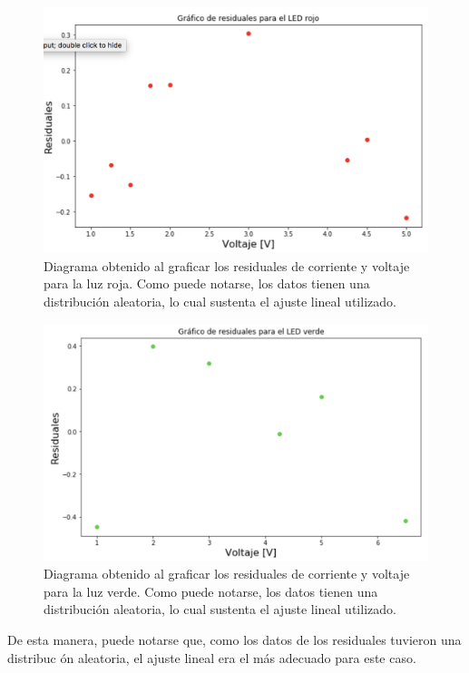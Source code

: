\documentclass[%
 reprint,
 amsmath,amssymb,
 aps,
]{revtex4-1}
\begin{document}
\begin{figure}[H]
    \centering
    \includegraphics[scale= 0.34]{resLEDrojo.png}
    \caption{Diagrama obtenido al graficar los residuales de corriente y voltaje para la luz roja. Como puede notarse, los datos tienen una distribución aleatoria, lo cual sustenta el ajuste lineal utilizado.}
    \label{fig:ambarRes}
\end{figure}

\begin{figure}[H]
    \centering
    \includegraphics[scale= 0.34]{resLEDverde.png}
    \caption{Diagrama obtenido al graficar los residuales de corriente y voltaje para la luz verde. Como puede notarse, los datos tienen una distribución aleatoria, lo cual sustenta el ajuste lineal utilizado.}
    \label{fig:ambarRes}
\end{figure}

De esta manera, puede notarse que, como los datos de los residuales tuvieron una distribuc
ón aleatoria, el ajuste lineal era el más adecuado para este caso. \\
\end{document}
